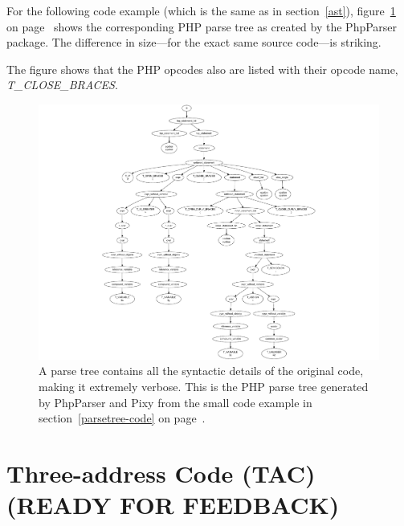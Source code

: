 For the following code example (which is the same as in section~\ref{ast}), figure~\ref{fig:parse-tree} on page~\pageref{fig:parse-tree} shows the corresponding PHP parse tree as created by the PhpParser package. The difference in size---for the exact same source code---is striking.

The figure shows that the PHP opcodes also are listed with their opcode name, \eg \emph{T\_CLOSE\_BRACES}.

\label{parsetree-code}

\begin{figure}[htb]
  \begin{center}
    \includegraphics[scale=0.84, trim=54mm 0mm 0mm 0mm]{images/parse-tree}
    \caption{A parse tree contains all the syntactic details of the original code, making it extremely verbose. This is the PHP parse tree generated by PhpParser and Pixy from the small code example in section~\ref{parsetree-code} on page~\pageref{parsetree-code}.}
    \label{fig:parse-tree}
  \end{center}
\end{figure}



\section{Three-address Code (TAC) (READY FOR FEEDBACK)}
\label{tac}


